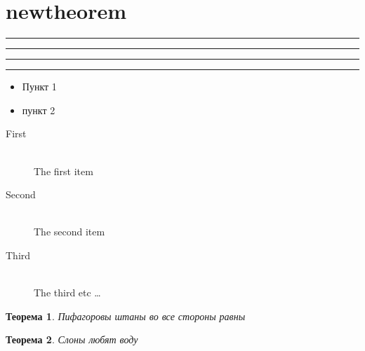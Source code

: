 \documentclass{article}
\begin{document}
 \section{newtheorem}    
     
     


\newlength{\barlength}
\setlength{\barlength}{4 cm minus 1 cm}
 \noindent
  \textcolor{barcolor1}{\rule{\barlength}{1cm}}
 \rule{\barlength}{1pt}
 \vspace{\barlength}
  \textcolor{barcolor2}{\rule{\barlength}{1cm}}
  \textcolor{gray50}{\rule{\barlength}{1 cm}}
    
		
        
        
   \begin{itemize}
   	\renewcommand{\labelitemi}{}
       \item Пункт 1 
       \item пункт 2
     \end{itemize}   
        
    \begin{description}
        \item[First] \hfill \\
        The first item
        \item[Second] \hfill \\
        The second item
        \item[Third] \hrulefill \\
        The third etc \ldots
    \end{description}    
   
   \newtheorem{thm}{Теорема}     
     \newtheorem{zadacha}{Задача} 
     
   \begin{thm}
   	Пифагоровы штаны во все стороны равны
   	\end{thm}  
   	
   	\begin{thm}
   		Слоны любят воду
   	\end{thm}  
          
\end{document}
